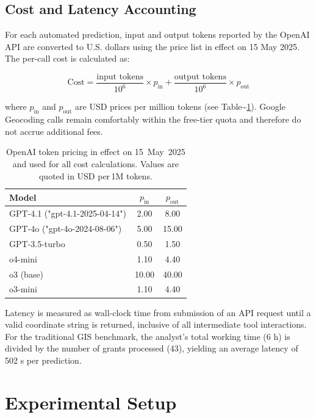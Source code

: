 \subsection{Cost and Latency
Accounting}\label{cost-and-latency-accounting}

For each automated prediction, input and output tokens reported by the
OpenAI API are converted to U.S. dollars using the price list in effect
on 15 May 2025. The per-call cost is calculated as:

\[
\text{Cost} = \frac{\text{input tokens}}{10^{6}} \times p_{\text{in}} + \frac{\text{output tokens}}{10^{6}} \times p_{\text{out}}
\]

where \(p_{\text{in}}\) and \(p_{\text{out}}\) are USD prices per
million tokens (see Table\textasciitilde{}\ref{tbl:prices}). Google
Geocoding calls remain comfortably within the free-tier quota and
therefore do not accrue additional fees.

\begin{table}[H]
\centering
\caption{OpenAI token pricing in effect on 15~May~2025 and used for all cost calculations.  Values are quoted in USD per\,1M tokens.}
\label{tbl:prices}
\begin{tabular}{lcc}
\toprule
Model & $p_{\text{in}}$ & $p_{\text{out}}$ \\
\midrule
GPT-4.1 ("gpt-4.1-2025-04-14") & 2.00 & 8.00 \\
GPT-4o ("gpt-4o-2024-08-06") & 5.00 & 15.00 \\
GPT-3.5-turbo & 0.50 & 1.50 \\
o4-mini & 1.10 & 4.40 \\
o3 (base) & 10.00 & 40.00 \\
o3-mini & 1.10 & 4.40 \\
\bottomrule
\end{tabular}
\end{table}

Latency is measured as wall-clock time from submission of an API request
until a valid coordinate string is returned, inclusive of all
intermediate tool interactions. For the traditional GIS benchmark, the
analyst's total working time (6 h) is divided by the number of grants
processed (43), yielding an average latency of 502 s per prediction.

\section{Experimental Setup}\label{experimental-setup}

